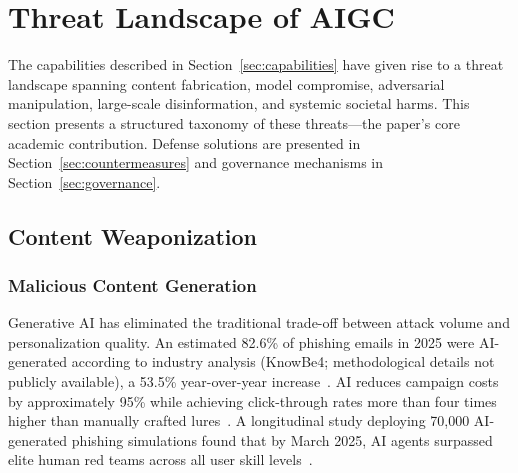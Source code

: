 
\section{Threat Landscape of AIGC}
\label{sec:threats}

The capabilities described in Section~\ref{sec:capabilities} have given rise to a threat landscape spanning content fabrication, model compromise, adversarial manipulation, large-scale disinformation, and systemic societal harms. This section presents a structured taxonomy of these threats---the paper's core academic contribution. Defense solutions are presented in Section~\ref{sec:countermeasures} and governance mechanisms in Section~\ref{sec:governance}.


\subsection{Content Weaponization}
\label{sec:threat-weapon}

\subsubsection{Malicious Content Generation}
\label{sec:threat-phishing}

Generative AI has eliminated the traditional trade-off between attack volume and personalization quality. An estimated 82.6\% of phishing emails in 2025 were AI-generated according to industry analysis (KnowBe4; methodological details not publicly available), a 53.5\% year-over-year increase~\cite{knowbe4_2025}. AI reduces campaign costs by approximately 95\% while achieving click-through rates more than four times higher than manually crafted lures~\cite{slashnext2025}. A longitudinal study deploying 70,000 AI-generated phishing simulations found that by March 2025, AI agents surpassed elite human red teams across all user skill levels~\cite{hoxhunt2025}.

